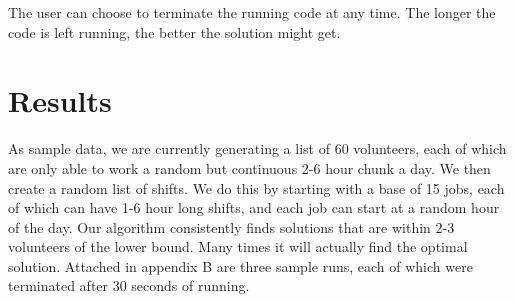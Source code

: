 \documentclass[11pt]{article}
\newif\ifcomment
\newcommand{\comment}[1]{\ifcomment#1\fi}
\theoremstyle{definition}
\begin{document}
\begin{multicols}{2}
The user can choose to terminate the running code at any time. The longer the code is left running, the better the solution might get. 


\comment{
Our program takes the following as input from the event organizers:
\begin{itemize}
\item A list of volunteers each with their preferences and the jobs they can do.
\item A list of jobs and the shifts for the jobs.
\item The maximum number of hours a volunteer can work in a day.
\item The maximum and minimum number of hours a volunteer can work total for the event
\end{itemize}
However, in script form, we allowed these inputs to be hardcoded in as constants.
Savoy Swing Club does not have any upcoming events until September of this year so the priority is getting a good algorithm that makes favorable schedules.

Given a large pool of potential volunteers, we randomly pick sufficiently sized subsets of the volunteers and try to match them.
One would think that this probably doesn't give a very good result but it turns out, based on the very lowest possible bound of the number of volunteers required to run the event, our algorithm usually finds an schedules with a factor of 2 volunteers.

We encode the problem of volunteers having external time conflicts by pre-filling each volunteer's schedule with ``jobs'' that are labeled ``UNAVAILABLE''.
} %



\section{Results}
As sample data, we are currently generating a list of 60 volunteers, each of which are only able to work a random but continuous 2-6 hour chunk a day. We then create a random list of shifts. 
We do this by starting with a base of 15 jobs, each of which can have 1-6 hour long shifts, and each job can start at a random hour of the day. Our algorithm consistently finds solutions that are
within 2-3 volunteers of the lower bound. Many times it will actually find the optimal solution. Attached in appendix B are three sample runs, each of which were terminated after 30 seconds of running.


\end{multicols}
\end{document}
